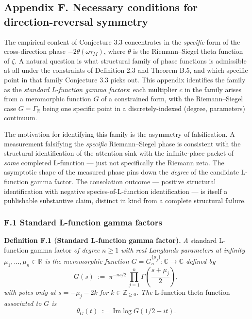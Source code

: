 \documentclass[
  letterpaper,
  11pt]{article}
\theoremstyle{plain}
\theoremstyle{definition}
\theoremstyle{remark}
\begin{document}
\subsection{Appendix F. Necessary conditions for direction-reversal symmetry}\label{appendix-f.-necessary-conditions-for-direction-reversal-symmetry}

The empirical content of Conjecture 3.3 concentrates in the \emph{specific} form of the cross-direction phase \(-2\theta(\omega\tau_M)\), where \(\theta\) is the Riemann--Siegel theta function of \(\zeta\). A natural question is what structural family of phase functions is admissible at all under the constraints of Definition 2.3 and Theorem B.5, and which specific point in that family Conjecture 3.3 picks out. This appendix identifies the family as the \emph{standard L-function gamma factors}: each multiplier \(c\) in the family arises from a meromorphic function \(G\) of a constrained form, with the Riemann--Siegel case \(G = \Gamma_{\mathbb{R}}\) being one specific point in a discretely-indexed (degree, parameters) continuum.

The motivation for identifying this family is the asymmetry of falsification. A measurement falsifying the \emph{specific} Riemann--Siegel phase is consistent with the structural identification of the attention sink with the infinite-place packet of \emph{some} completed L-function --- just not specifically the Riemann zeta. The asymptotic shape of the measured phase pins down the \emph{degree} of the candidate L-function gamma factor. The consolation outcome --- positive structural identification with negative species-of-L-function identification --- is itself a publishable substantive claim, distinct in kind from a complete structural failure.

\subsubsection{F.1 Standard L-function gamma factors}\label{f.1-standard-l-function-gamma-factors}

\textbf{Definition F.1 (Standard L-function gamma factor).} \emph{A} standard L-function gamma factor \emph{of degree \(n \geq 1\) with real Langlands parameters at infinity \(\mu_1, \ldots, \mu_n \in \mathbb{R}\) is the meromorphic function \(G = G_n^{\{\mu_j\}}: \mathbb{C} \to \mathbb{C}\) defined by}
\[G(s) \;:=\; \pi^{-ns/2}\,\prod_{j=1}^n \Gamma\!\left(\frac{s + \mu_j}{2}\right),\]
\emph{with poles only at \(s = -\mu_j - 2k\) for \(k \in \mathbb{Z}_{\geq 0}\). The} L-function theta function \emph{associated to \(G\) is}
\[\theta_G(t) \;:=\; \mathrm{Im}\log G(1/2 + it).\]
\end{document}
